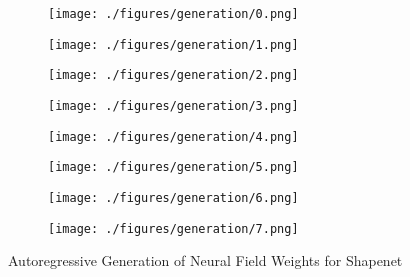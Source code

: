\begin{figure*}[t]
  \centering
  \begin{subfigure}{.24\linewidth}
    \centering
    \texttt{[image: ./figures/generation/0.png]}
  \end{subfigure}
  \begin{subfigure}{.24\linewidth}
    \centering
    \texttt{[image: ./figures/generation/1.png]}
  \end{subfigure}
  \begin{subfigure}{.24\linewidth}
    \centering
    \texttt{[image: ./figures/generation/2.png]}
  \end{subfigure}
  \begin{subfigure}{.24\linewidth}
    \centering
    \texttt{[image: ./figures/generation/3.png]}
  \end{subfigure}
  \begin{subfigure}{.24\linewidth}
    \centering
    \texttt{[image: ./figures/generation/4.png]}
  \end{subfigure}
  \begin{subfigure}{.24\linewidth}
    \centering
    \texttt{[image: ./figures/generation/5.png]}
  \end{subfigure}
  \begin{subfigure}{.24\linewidth}
    \centering
    \texttt{[image: ./figures/generation/6.png]}
  \end{subfigure}
  \begin{subfigure}{.24\linewidth}
    \centering
    \texttt{[image: ./figures/generation/7.png]}
  \end{subfigure}

  \caption{\label{fig:generation} Autoregressive Generation of Neural Field Weights for Shapenet}

\end{figure*}



